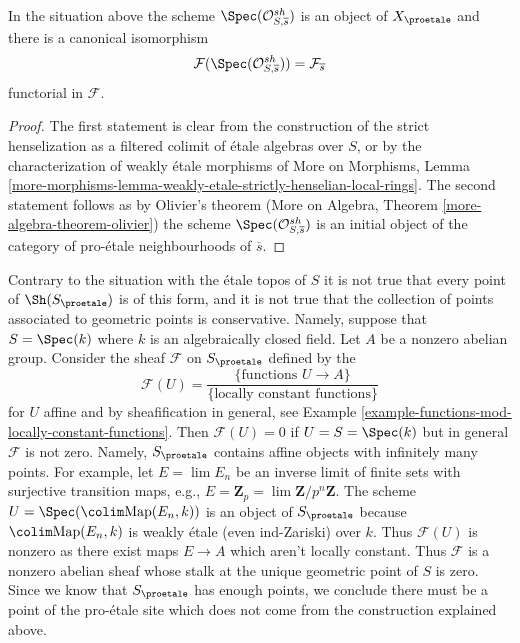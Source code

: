 \begin{lemma}
\label{lemma-classical-point}
In the situation above the scheme $\Spec(\mathcal{O}_{S, \overline{s}}^{sh})$
is an object of $X_\proetale$ and there is a canonical isomorphism
$$
\mathcal{F}(\Spec(\mathcal{O}_{S, \overline{s}}^{sh})) =
\mathcal{F}_{\overline{s}}
$$
functorial in $\mathcal{F}$.
\end{lemma}

\begin{proof}
The first statement is clear from the construction of the strict henselization
as a filtered colimit of \'etale algebras over $S$, or by the characterization
of weakly \'etale morphisms of
More on Morphisms, Lemma
\ref{more-morphisms-lemma-weakly-etale-strictly-henselian-local-rings}.
The second statement follows as by Olivier's theorem
(More on Algebra, Theorem \ref{more-algebra-theorem-olivier})
the scheme $\Spec(\mathcal{O}_{S, \overline{s}}^{sh})$
is an initial object of the category of pro-\'etale neighbourhoods
of $\overline{s}$.
\end{proof}

\noindent
Contrary to the situation with the \'etale topos of $S$ it is not true
that every point of $\Sh(S_\proetale)$ is of this form, and it is not
true that the collection of points associated to geometric points is
conservative. Namely, suppose that $S = \Spec(k)$ where $k$ is an
algebraically closed field. Let $A$ be a nonzero abelian group.
Consider the sheaf $\mathcal{F}$ on $S_\proetale$ defined by the
$$
\mathcal{F}(U) =
\frac{\{\text{functions }U \to A\}}{\{\text{locally constant functions}\}}
$$
for $U$ affine and by sheafification in general, see
Example \ref{example-functions-mod-locally-constant-functions}.
Then $\mathcal{F}(U) = 0$ if $U = S = \Spec(k)$ but in general $\mathcal{F}$
is not zero. Namely, $S_\proetale$ contains affine objects
with infinitely many points. For example, let $E = \lim E_n$
be an inverse limit of finite sets with surjective transition maps,
e.g., $E = \mathbf{Z}_p = \lim \mathbf{Z}/p^n\mathbf{Z}$. The scheme
$U = \Spec(\colim \text{Map}(E_n, k))$ is an object of $S_\proetale$
because $\colim \text{Map}(E_n, k)$ is weakly \'etale (even ind-Zariski)
over $k$. Thus $\mathcal{F}(U)$ is nonzero as there exist maps $E \to A$
which aren't locally constant.
Thus $\mathcal{F}$ is a nonzero abelian sheaf whose stalk at the
unique geometric point of $S$ is zero. Since we know that $S_\proetale$
has enough points, we conclude there must be a point of the pro-\'etale
site which does not come from the construction explained above.

